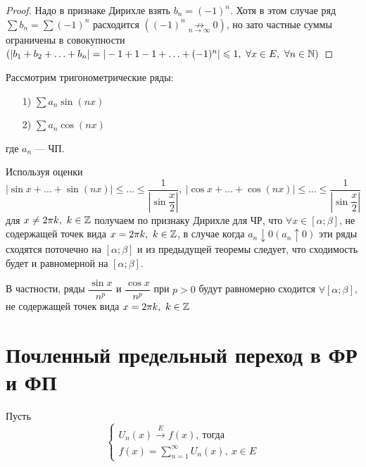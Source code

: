 \documentclass[../../main.tex]{subfiles}
\begin{document}
\begin{proof}
Надо в признаке Дирихле взять $b_n=(-1)^n$. Хотя в этом случае ряд 
$\sum b_n = \sum (-1)^n$ расходится $((-1)^n 
\underset{n \to \infty}{\not \longrightarrow} 0)$, но зато частные суммы
ограничены в совокупности $(|b_1 + b_2 + \ldots + b_n| = 
|-1+1-1+ \ldots + (-1)^n| \leqslant 1,\ \forall x \in E,\ \forall n \in \mathbb{N})$
\end{proof}	

\begin{exmps}
Рассмотрим тригонометрические ряды: 
	\begin{itemize}
		\item[1)] $\sum a_n \sin(nx)$
		\item[2)] $\sum a_n \cos(nx)$
	\end{itemize}
где $a_n$ --- ЧП.

Используя оценки $|\sin x + \ldots + \sin(nx)| 
\leq \ldots \leq \dfrac{1}{|\sin\dfrac{x}{2}|},\
|\cos x + \ldots + \cos(nx)| 
\leq \ldots \leq \dfrac{1}{|\sin\dfrac{x}{2}|}$
для $x \neq 2\pi k,\ k \in \mathbb{Z}$ получаем по признаку Дирихле для ЧР, что
$\forall x \in [\alpha; \beta]$, не содержащей точек вида 
$x = 2\pi k,\ k \in \mathbb{Z}$, в случае когда $a_n \downarrow 0 (a_n \uparrow 0)$ 
эти ряды сходятся поточечно на $[\alpha; \beta]$ и 
из предыдущей теоремы следует, что сходимость будет и равномерной
на $[\alpha; \beta]$.

В частности, ряды $\dfrac{\sin x}{n^p}$ и $\dfrac{\cos x}{n^p}$ при
$p > 0$ будут равномерно сходится $\forall [\alpha; \beta]$, не содержащей
точек вида $x = 2\pi k,\ k \in \mathbb{Z}$ 
\end{exmps}

\section{Почленный предельный переход в ФР и ФП}
Пусть 
\begin{equation}
\label{lec2:15}
\begin{cases}
U_n(x) \overset{E}{\longrightarrow} f(x),\ \text{тогда} \\
f(x) = \sum\limits_{n = 1}^{\infty} U_n(x),\ x \in E
\end{cases}
\end{equation}
\end{document}
